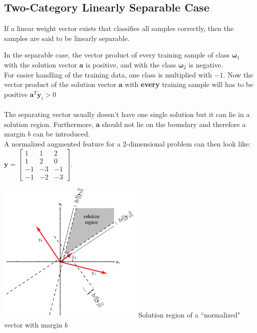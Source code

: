   \subsection{Two-Category Linearly Separable Case}
    If a linear weight vector exists that classifies all samples correctly, then the samples
    are said to be linearly separable.
    \begin{minipage}{11cm}
    
    In the separable case, the vector product of every training sample of class $\bm \omega_1$ with the solution
    vector $\bm a$ is positive, and with the class $\bm \omega_2$ is negative.\\
    For easier handling of the training data, one class is multiplied with $-1$. Now the vector product of the solution vector $\bm a$
     with \textbf{every} training sample will has to be positive $\bm a^T \bm y_i  > 0$\\\\
    The separating vector usually doesn't have one single solution but it can lie in a solution
    region. Furthermore, $\bm a$ should not lie on the boundary and therefore a margin $b$
    can be introduced.\\
        
    A normalized augmented feature for a 2-dimensional problem can then look like:
    $\bm y = \begin{bmatrix}
      1 & 1 & 2\\
      1 & 2 & 0\\
      -1 & -3 & -1\\
      -1 & -2 & -3
    \end{bmatrix}$.
    \end{minipage}
    \hspace{5mm}
    \begin{minipage}{7cm}
    	 \includegraphics[width=7cm]{./images/solutionRegionWithMargin.png}
    	 Solution region of a ``normalized" vector with margin $b$
 	\end{minipage}
    
